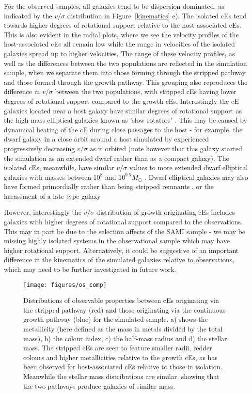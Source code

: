 \documentclass[a4paper,fleqn,usenatbib]{mnras}
\begin{document}
For the observed samples, all galaxies tend to be dispersion dominated, as indicated by the $v/\sigma$ distribution in Figure~\ref{kinematics} e). The isolated cEs tend towards higher degrees of rotational support relative to the host-associated cEs. This is also evident in the radial plots, where we see the velocity profiles of the host-associated cEs all remain low while the range in velocities of the isolated galaxies spread up to higher velocities. The range of these velocity profiles, as well as the differences between the two populations are reflected in the simulation sample, when we separate them into those forming through the stripped pathway and those formed through the growth pathway. This grouping also reproduces the difference in $v/\sigma$ between the two populations, with stripped cEs having lower degrees of rotational support compared to the growth cEs. Interestingly the cE galaxies located near a host galaxy have similar degrees of rotational support as the high-mass elliptical galaxies known as 'slow rotators' \citep{2019A&A...632A..59F}. This may be caused by dynamical heating of the cE during close passages to the host - for example, the dwarf galaxy in a close orbit around a host simulated by \citet{2019ApJ...875...58D} experienced progressively decreasing $v/\sigma$ as it orbited (note however that this galaxy started the simulation as an extended dwarf rather than as a compact galaxy). The isolated cEs, meanwhile, have similar $v/\sigma$ values to more extended dwarf elliptical galaxies with masses between $10^{8}$ and $10^{9.5} M_{\odot}$ \citep{2020MNRAS.497.1571S}. Dwarf elliptical galaxies may also have formed primordially rather than being stripped remnants  \citep{2009MNRAS.396.2133K}, or the harassment of a late-type galaxy \citep{2009A&A...494..891A}


However, interestingly the $v/\sigma$ distribution of growth-originating cEs includes galaxies with higher degrees of rotational support compared to the observations. This may in part be due to the selection affects of the SAMI sample - we may be missing highly isolated systems in the observational sample which may have higher rotational support. Alternatively, it could be suggestive of an important difference in the kinematics of the simulated galaxies relative to observations, which may need to be further investigated in future work.   



\begin{figure}
\texttt{[image: figures/os\_comp]}
   \caption{Distributions of observable properties between cEs originating via the stripped pathway (red) and those originating via the continuous growth pathway (blue) for the simulated sample. a) shows the metallicity (here defined as the mass in metals divided by the total mass), b) the colour index, c) the half-mass radius and d) the stellar mass. The stripped cEs are seen to feature smaller radii, redder colours and higher metallicities relative to the growth cEs, as has been observed for host-associated cEs relative to those in isolation. Meanwhile the stellar mass distributions are similar, showing that the two pathways produce galaxies of similar mass.}
 \label{obs_comp}
 \end{figure}
\end{document}
